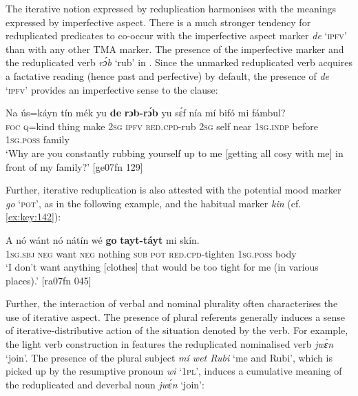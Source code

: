 The iterative notion expressed by reduplication harmonises with the meanings expressed by imperfective aspect. There is a much stronger tendency for reduplicated predicates to co-occur with the imperfective aspect marker \textit{de} ‘\textsc{ipfv}’ than with any other TMA marker. The presence of the imperfective marker and the reduplicated verb \textit{rɔ́b} ‘rub’ in . Since the unmarked reduplicated verb acquires a factative reading (hence past and perfective) by default, the presence of \textit{de} ‘\textsc{ipfv’} provides an imperfective sense to the clause:



\ea%
    \label{ex:key:138}
    \gll Na  ús=káyn  tín    mék    yu  \textbf{de}   \textbf{rɔb-rɔ́b}    yu  sɛ́f  nía  mí
bifó    mi    fámbul?\\
\textsc{foc}  \textsc{q}=kind  thing  make  \textsc{2sg}  \textsc{ipfv}  \textsc{red}.\textsc{cpd-}rub  \textsc{2sg}  self  near  \textsc{1sg.indp}
before  \textsc{1sg.poss}  family\\

\glt ‘Why are you constantly rubbing yourself up to me [getting all cosy with me] in front of my family?’ [ge07fn 129]
\z

Further, iterative reduplication is also attested with the potential mood marker \textit{go} ‘\textsc{pot’}, as in the following example, and the habitual marker \textit{kin} (cf. \ref{ex:key:142}):


\ea%
    \label{ex:key:139}
    \gll \MakeUppercase{A}   nó  wánt  nó  nátín  wé  \textbf{go}  \textbf{tayt-táyt}      mi    skín.\\
\textsc{1sg.sbj}  \textsc{neg}  want  \textsc{neg}  nothing  \textsc{sub}  \textsc{pot}  \textsc{red.cpd-}tighten  \textsc{1sg.poss}  body\\

\glt ‘I don’t want anything [clothes] that would be too tight for me (in various places).’ [ra07fn 045]
\z

Further, the interaction of verbal and nominal plurality often characterises the use of iterative aspect. The presence of plural referents generally induces a sense of iterative-distributive action of the situation denoted by the verb. For example, the light verb construction in  features the reduplicated nominalised verb \textit{jwɛ́n} ‘join’. The presence of the plural subject \textit{mí wet Rubi} ‘me and Rubi’, which is picked up by the resumptive pronoun{\fff} \textit{wi} ‘\textsc{1pl}’, induces a cumulative meaning of the reduplicated and deverbal noun \textit{jwɛ́n} ‘join’:


